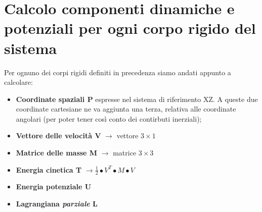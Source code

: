 \section{Calcolo componenti dinamiche e potenziali per ogni corpo rigido del sistema}
Per ognuno dei corpi rigidi definiti in precedenza siamo andati appunto a calcolare:

\begin{itemize}
	\item \textbf{Coordinate spaziali P} espresse nel sistema di riferimento XZ. A queste due coordinate cartesiane ne va aggiunta una terza, relativa alle coordinate angolari (per poter tener così conto dei contirbuti inerziali);
	\item \textbf{Vettore delle velocità V} $\rightarrow$ vettore $3\times 1$
	\item \textbf{Matrice delle masse M} $\rightarrow$ matrice $3\times 3$
	\item \textbf{Energia cinetica T} $\rightarrow \frac{1}{2}\bullet V^T \bullet M \bullet V$
	\item \textbf{Energia potenziale U}
	\item \textbf{Lagrangiana \textit{parziale} L}
\end{itemize}

